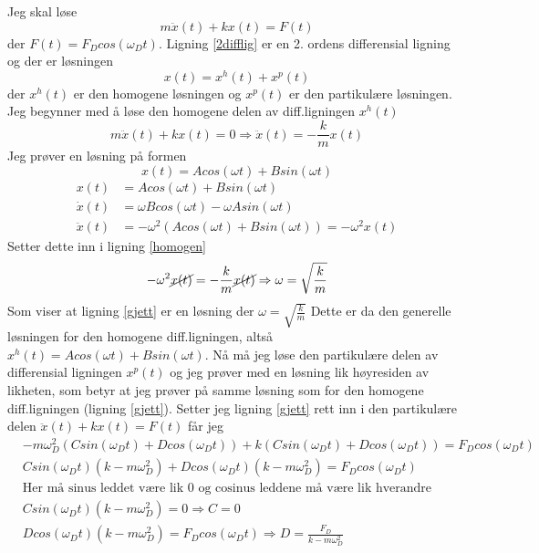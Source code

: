 \documentclass[norsk,a4paper,12pt]{article}
\begin{document}
Jeg skal løse 
\begin{equation}
m\ddot{x}(t) + kx(t) = F(t)
\label{2difflig}
\end{equation}
der $F(t) = F_Dcos(\omega_Dt)$. Ligning \vref{2difflig} er en 2. ordens differensial ligning og der er løsningen 
\begin{equation}
x(t) = x^h(t) + x^p(t)
\label{losning}
\end{equation}
der $x^h(t)$ er den homogene løsningen og $x^p(t)$ er den partikulære løsningen. 
Jeg begynner med å løse den homogene delen av diff.ligningen $x^h(t)$
\begin{equation}
m\ddot{x}(t) + kx(t) = 0 \Rightarrow \ddot{x}(t) = -\frac{k}{m}x(t)
\label{homogen}
\end{equation}
Jeg prøver en løsning på formen 
\begin{equation}
x(t) = Acos(\omega t) + Bsin(\omega t)
\label{gjett}
\end{equation}
\begin{align*}
x(t) &=  Acos(\omega t) + Bsin(\omega t)\\
\dot{x}(t) &=  \omega Bcos(\omega t) - \omega Asin(\omega t)\\
\ddot{x}(t) & = -\omega^2( Acos(\omega t) + Bsin(\omega t)) = -\omega^2x(t)
\end{align*} 
Setter dette inn i ligning \vref{homogen}
\begin{align*}
-\omega^2\cancel{x(t)} = -\frac{k}{m}\cancel{x(t)} \Rightarrow \omega = \sqrt{\frac{k}{m}}
\end{align*}
Som viser at ligning \vref{gjett} er en løsning der $\omega =  \sqrt{\frac{k}{m}}$
Dette er da den generelle løsningen for den homogene diff.ligningen, altså $x^h(t) = Acos(\omega t) + Bsin(\omega t) $. 
Nå må jeg løse den partikulære delen av differensial ligningen $x^p(t)$ og jeg prøver med en løsning lik høyresiden av likheten, som betyr at jeg prøver på samme løsning som for den homogene diff.ligningen (ligning \vref{gjett}). Setter jeg ligning \vref{gjett} rett inn i den partikulære delen $\ddot{x}(t) + kx(t) = F(t)$ får jeg
\begin{align*}
&-m\omega_D^2(Csin(\omega_Dt)+Dcos(\omega_Dt)) + k(Csin(\omega_Dt)+Dcos(\omega_Dt)) = F_Dcos(\omega_Dt)\\
&Csin(\omega_Dt)(k-m\omega_D^2) + Dcos(\omega_Dt)(k-m\omega_D^2) = F_Dcos(\omega_Dt)\\
&\text{Her må sinus leddet være lik 0 og cosinus leddene må være lik hverandre}\\
&Csin(\omega_Dt)(k-m\omega_D^2) = 0 \Rightarrow C=0\\
&Dcos(\omega_Dt)(k-m\omega_D^2) = F_Dcos(\omega_Dt) \Rightarrow D = \frac{F_D}{k-m\omega_D^2}
\end{align*}
\end{document}
